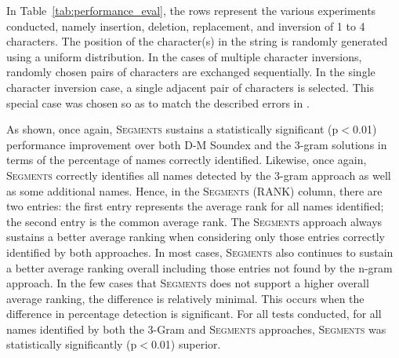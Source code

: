 \documentclass{endm}
\begin{document}
\begin{CJK}{UTF8}{song}
In Table~\ref{tab:performance_eval}, the rows represent the various experiments conducted, namely insertion, deletion, replacement, and inversion of 1 to 4 characters.  The position of the character(s) in the string is randomly generated using a uniform distribution.  In the cases of multiple character inversions, randomly chosen pairs of characters are exchanged sequentially.  In the single character inversion case, a single adjacent pair of characters is selected.  This special case was chosen so as to match the described errors in \cite{mitton:spellchecking}.

As shown, once again, S\textsc{egments} sustains a statistically significant (p$<$0.01) performance improvement over both D-M Soundex and the 3-gram solutions in terms of the percentage of names correctly identified.  Likewise, once again, S\textsc{egments} correctly identifies all names detected by the 3-gram approach as well as some additional names.  Hence, in the S\textsc{egments} (RANK) column, there are two entries: the first entry represents the average rank for all names identified; the second entry is the common average rank.  The S\textsc{egments} approach always sustains a better average ranking when considering only those entries correctly identified by both approaches.  In most cases, S\textsc{egments} also continues to sustain a better average ranking overall including those entries not found by the n-gram approach.  In the few cases that S\textsc{egments} does not support a higher overall average ranking, the difference is relatively minimal.  This occurs when the difference in percentage detection is significant.  For all tests conducted, for all names identified by both the 3-Gram and S\textsc{egments} approaches, S\textsc{egments} was statistically significantly (p$<$0.01) superior.




\end{CJK}
\end{document}
